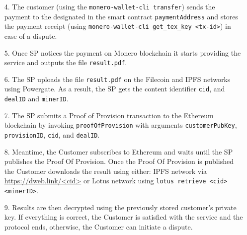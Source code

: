 \begin{enumerate}
  \item[4.] The customer (using the \texttt{monero-wallet-cli transfer}) sends the payment to the designated in the smart contract \texttt{paymentAddress} and stores the payment receipt (using \texttt{monero-wallet-cli get\_tex\_key <tx-id>}) in case of a dispute.

  \item[5.] Once SP notices the payment on Monero blockchain it starts providing the service and outputs the file \texttt{result.pdf}.

  \item[6.] The SP uploads the file \texttt{result.pdf} on the Filecoin and IPFS networks using Powergate. As a result, the SP gets the content identifier \texttt{cid}, and \texttt{dealID} and \texttt{minerID}.

  \item[7.] The SP submits a Proof of Provision transaction to the Ethereum blockchain by invoking \texttt{proofOfProvision} with arguments \texttt{customer\-PubKey}, \texttt{provisionID}, \texttt{cid}, and \texttt{dealID}.

  \item[8.] Meantime, the Customer subscribes to Ethereum and waits until the SP publishes the Proof Of Provision.
 Once the Proof Of Provision is published the Customer downloads the result using either: IPFS network via \url{https://dweb.link/<cid>} or Lotus network using \texttt{lotus retrieve <cid> <minerID>}. 
 
  \item[9.] Results are then decrypted using the previously stored customer's private key. If everything is correct, the Customer is satisfied with the service and the protocol ends, otherwise, the Customer can initiate a dispute.

\end{enumerate}



